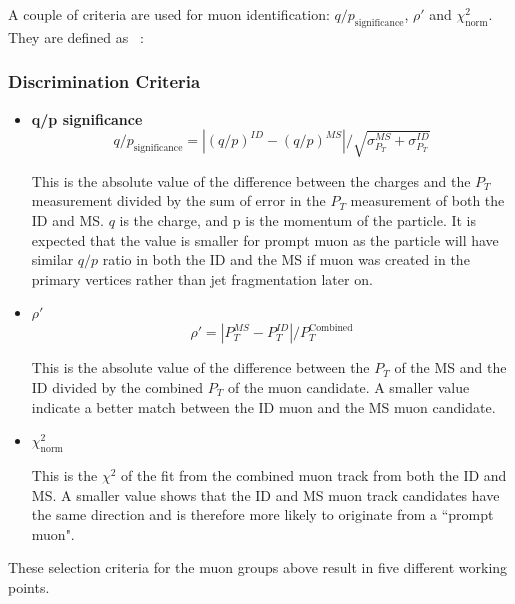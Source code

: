 A couple of criteria are used for muon identification: $q/p_{\textrm{significance}}$, $\rho'$ and $\chi^{2}_{\textrm{norm}}$. They are defined as ~\cite{muonReco2016}:

\subsubsection*{Discrimination Criteria}
\begin{itemize}

\item \textbf{q/p significance}
    \begin{equation}
    q/p_{\textrm{significance}} = |(q/p)^{ID} - (q/p)^{MS}|/\sqrt{\sigma^{MS}_{P_{T}} + \sigma^{ID}_{P_{T}}}
    \end{equation}

    This is the absolute value of the difference between the charges and the $P_{T}$ measurement divided by the sum of error in the $P_{T}$ measurement of both the ID and MS. $q$ is the charge, and p is the momentum of the particle. It is expected that the value is smaller for prompt muon as the particle will have similar $q/p$ ratio in both the ID and the MS if muon was created in the primary vertices rather than jet fragmentation later on. 

\item \textbf{$\rho'$}
    \begin{equation}
        \rho' = |P_{T}^{MS} - P_{T}^{ID}| / P_{T}^{\textrm{Combined}}
    \end{equation}

This is the absolute value of the difference between the $P_{T}$ of the MS and the ID divided by the combined $P_{T}$ of the muon candidate. A smaller value indicate a better match between the ID muon and the MS muon candidate.

\item \textbf{$\chi_{\textrm{norm}}^{2}$}

    This is the $\chi^{2}$ of the fit from the combined muon track from both the ID and MS. A smaller value shows that the ID and MS muon track candidates have the same direction and is therefore more likely to originate from a ``prompt muon".

\end{itemize}

These selection criteria for the muon groups above result in five different working points.

